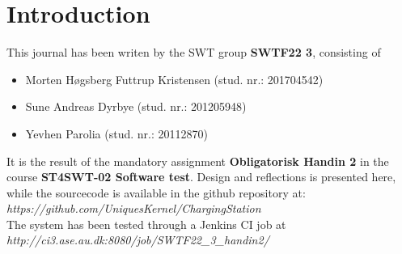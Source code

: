 \section{Introduction}

This journal has been writen by the SWT group \textbf{SWTF22 3}, consisting of 
\begin{itemize}
\item Morten H\o gsberg Futtrup Kristensen (stud. nr.: 201704542)
\item Sune Andreas Dyrbye (stud. nr.: 201205948)
\item Yevhen Parolia (stud. nr.: 20112870)
\end{itemize}
It is the result of the mandatory assignment \textbf{Obligatorisk Handin 2} in the course \textbf{ST4SWT-02 Software test}. Design and reflections is presented here, while the sourcecode is available in the github repository at:\\
\emph{https://github.com/UniquesKernel/ChargingStation}\\

The system has been tested through a Jenkins CI job at\\
\emph{http://ci3.ase.au.dk:8080/job/SWTF22\_3\_handin2/}

\newpage
